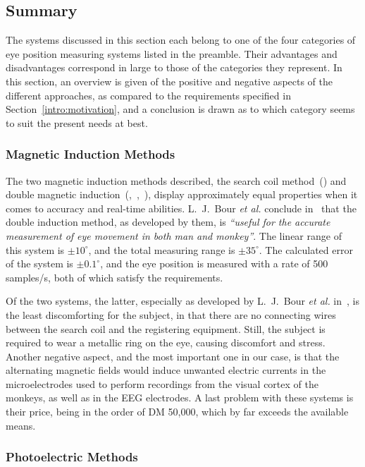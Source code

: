 \subsection{Summary}
\label{back:track:summary}

The systems discussed in this section each belong to one of the four
categories of eye position measuring systems listed in the preamble.
Their advantages and disadvantages correspond in large to those of the
categories they represent.  In this section, an overview is given of
the positive and negative aspects of the different approaches, as
compared to the requirements specified in
Section~\ref{intro:motivation}, and a conclusion is drawn as to which
category seems to suit the present needs at best.

\subsubsection{Magnetic Induction Methods}

The two magnetic induction methods described, the search coil
method~(\cite{robinson}) and double magnetic
induction~(\cite{allik},~\cite{reulen},~\cite{coil}), display
approximately equal properties when it comes to accuracy and real-time
abilities.  L.\ J.\ Bour {\em et al.\/} conclude in~\cite{coil} that
the double induction method, as developed by them, is {\em ``useful
  for the accurate measurement of eye movement in both man and
  monkey''\/}.  The linear range of this system is $\pm 10^{\circ}$,
and the total measuring range is $\pm 35^{\circ}$.  The calculated
error of the system is $\pm 0.1^{\circ}$, and the eye position is
measured with a rate of 500 samples/s, both of which satisfy the
requirements.

Of the two systems, the latter, especially as developed by L.\ J.\ 
Bour {\em et al.\/} in~\cite{coil}, is the least discomforting for the
subject, in that there are no connecting wires between the search coil
and the registering equipment.  Still, the subject is required to wear
a metallic ring on the eye, causing discomfort and stress.  Another
negative aspect, and the most important one in our case, is that the
alternating magnetic fields would induce unwanted electric currents in
the microelectrodes used to perform recordings from the visual cortex
of the monkeys, as well as in the EEG electrodes.  A last problem with
these systems is their price, being in the order of DM 50,000, which
by far exceeds the available means.

\subsubsection{Photoelectric Methods}

